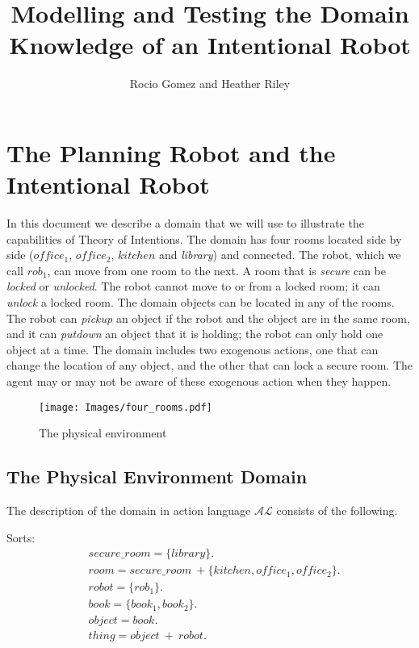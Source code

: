 \documentclass[11pt, oneside]{article}
\title{Modelling and Testing the Domain Knowledge of an Intentional Robot}
\author{Rocio Gomez and Heather Riley}
\begin{document}
\maketitle

\section{The Planning Robot and the Intentional Robot}

In this document we describe a domain that we will use to illustrate
the capabilities of Theory of Intentions. The domain has four rooms
located side by side ($office_1$, $office_2$, $kitchen$ and
\emph{library}) and connected. The robot, which we call $rob_1$,
can move from one room to the next. A room that is \emph{secure} can
be \emph{locked} or \emph{unlocked}. The robot cannot move to or from
a locked room; it can \emph{unlock} a locked room. The domain objects
can be located in any of the rooms. The robot can \emph{pickup} an
object if the robot and the object are in the same room, and it can
\emph{putdown} an object that it is holding; the robot can only hold
one object at a time. The domain includes two exogenous actions, one
that can change the location of any object, and the other that can
lock a secure room. The agent may or may not be aware of these
exogenous action when they happen.

\begin{figure*}[tb]
\centering
\texttt{[image: Images/four\_rooms.pdf]}
\caption{The physical environment}
\end{figure*}

\subsection{The Physical Environment Domain}

The description of the domain in action language $\mathcal{AL}$
consists of the following.

Sorts:
\begin{align*}
  &secure\_room = \{library\}.\\
  &room = secure\_room\ +\{kitchen, office_1, office_2\}.\\
  &robot = \{rob_1\}.\\
  &book = \{book_1, book_2\}.\\
  &object = book.\\
  &thing = object\ +\ robot.
\end{align*}
\end{document}
